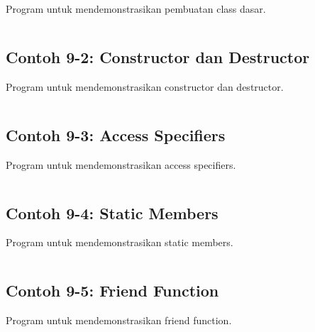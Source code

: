 Program untuk mendemonstrasikan pembuatan class dasar.

\begin{lstlisting}[language=c++, caption=Basic Class]

\end{lstlisting}

\subsection{Contoh 9-2: Constructor dan Destructor}

Program untuk mendemonstrasikan constructor dan destructor.

\begin{lstlisting}[language=c++, caption=Constructor dan Destructor]

\end{lstlisting}

\subsection{Contoh 9-3: Access Specifiers}

Program untuk mendemonstrasikan access specifiers.

\begin{lstlisting}[language=c++, caption=Access Specifiers]

\end{lstlisting}

\subsection{Contoh 9-4: Static Members}

Program untuk mendemonstrasikan static members.

\begin{lstlisting}[language=c++, caption=Static Members]

\end{lstlisting}

\subsection{Contoh 9-5: Friend Function}

Program untuk mendemonstrasikan friend function.

\begin{lstlisting}[language=c++, caption=Friend Function]

\end{lstlisting}

